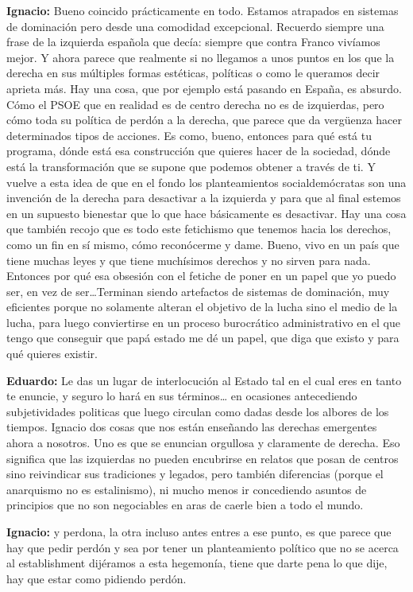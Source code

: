 \documentclass[
]{interact}
\begin{document}
\textbf{Ignacio:} Bueno coincido prácticamente en todo. Estamos
atrapados en sistemas de dominación pero desde una comodidad
excepcional. Recuerdo siempre una frase de la izquierda española que
decía: siempre que contra Franco vivíamos mejor. Y ahora parece que
realmente si no llegamos a unos puntos en los que la derecha en sus
múltiples formas estéticas, políticas o como le queramos decir aprieta
más. Hay una cosa, que por ejemplo está pasando en España, es absurdo.
Cómo el PSOE que en realidad es de centro derecha no es de izquierdas,
pero cómo toda su política de perdón a la derecha, que parece que da
vergüenza hacer determinados tipos de acciones. Es como, bueno, entonces
para qué está tu programa, dónde está esa construcción que quieres hacer
de la sociedad, dónde está la transformación que se supone que podemos
obtener a través de ti. Y vuelve a esta idea de que en el fondo los
planteamientos socialdemócratas son una invención de la derecha para
desactivar a la izquierda y para que al final estemos en un supuesto
bienestar que lo que hace básicamente es desactivar. Hay una cosa que
también recojo que es todo este fetichismo que tenemos hacia los
derechos, como un fin en sí mismo, cómo reconócerme y dame. Bueno, vivo
en un país que tiene muchas leyes y que tiene muchísimos derechos y no
sirven para nada. Entonces por qué esa obsesión con el fetiche de poner
en un papel que yo puedo ser, en vez de ser\ldots Terminan siendo
artefactos de sistemas de dominación, muy eficientes porque no solamente
alteran el objetivo de la lucha sino el medio de la lucha, para luego
conviertirse en un proceso burocrático administrativo en el que tengo
que conseguir que papá estado me dé un papel, que diga que existo y para
qué quieres existir.

\textbf{Eduardo:} Le das un lugar de interlocución al Estado tal en el
cual eres en tanto te enuncie, y seguro lo hará en sus términos\ldots{}
en ocasiones antecediendo subjetividades politicas que luego circulan
como dadas desde los albores de los tiempos. Ignacio dos cosas que nos
están enseñando las derechas emergentes ahora a nosotros. Uno es que se
enuncian orgullosa y claramente de derecha. Eso significa que las
izquierdas no pueden encubrirse en relatos que posan de centros sino
reivindicar sus tradiciones y legados, pero también diferencias (porque
el anarquismo no es estalinismo), ni mucho menos ir concediendo asuntos
de principios que no son negociables en aras de caerle bien a todo el
mundo.

\textbf{Ignacio:} y perdona, la otra incluso antes entres a ese punto,
es que parece que hay que pedir perdón y sea por tener un planteamiento
político que no se acerca al establishment dijéramos a esta hegemonía,
tiene que darte pena lo que dije, hay que estar como pidiendo perdón.
\end{document}
